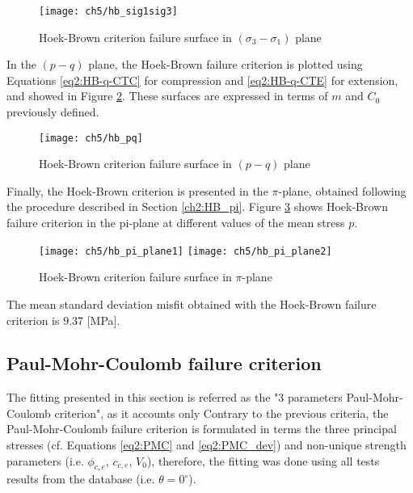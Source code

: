 \begin{figure}[p]
    \centering
    \texttt{[image: ch5/hb\_sig1sig3]}
    \caption{Hoek-Brown criterion failure surface in  $(\sigma_3-\sigma_1)$ plane}
    \label{fig5:hb_sig1sig3}
\end{figure} 

In the $(p-q)$ plane, the Hoek-Brown failure criterion is plotted using Equations \ref{eq2:HB-q-CTC} for compression and \ref{eq2:HB-q-CTE} for extension, and showed in Figure \ref{fig5:hb_pq}. These surfaces are expressed in terms of $m$ and $C_0$ previously defined. 

\begin{figure}[p]
    \centering
    \texttt{[image: ch5/hb\_pq]}
    \caption{Hoek-Brown criterion failure surface in  $(p-q)$ plane}
    \label{fig5:hb_pq}
\end{figure} 

Finally, the Hoek-Brown criterion is presented in the $\pi$-plane, obtained following the procedure described in Section \ref{ch2:HB_pi}. Figure \ref{fig5:hb_pi_plane} shows Hoek-Brown failure criterion in the pi-plane at different values of the mean stress $p$.

\begin{figure}[tb]
    \centering
    \texttt{[image: ch5/hb\_pi\_plane1]}
    \texttt{[image: ch5/hb\_pi\_plane2]}
    \caption{Hoek-Brown criterion failure surface in  $\pi$-plane}
    \label{fig5:hb_pi_plane}
\end{figure} 

The mean standard deviation misfit obtained with the Hoek-Brown failure criterion is $9.37$ [\si{\mega\pascal}]. 

\subsection{Paul-Mohr-Coulomb failure criterion}

The fitting presented in this section is referred as the "3 parameters Paul-Mohr-Coulomb criterion", as it accounts only 
Contrary to the previous criteria, the Paul-Mohr-Coulomb failure criterion is formulated in terms the three principal stresses (cf. Equations \ref{eq2:PMC} and \ref{eq2:PMC_dev}) and non-unique strength parameters (i.e. $\phi_{c,e}$, $c_{c,e}$, $V_0$), therefore, the fitting was done using all tests results from the database (i.e. $\theta = 0^\circ$). 

